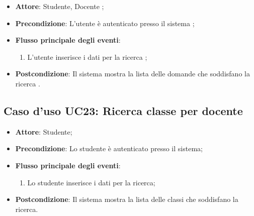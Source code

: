 \documentclass[12pt,a4paper]{article}
\begin{document}
\begin{itemize}

\item \textbf{Attore}: Studente, Docente
; 
\item \textbf{Precondizione}: L'utente è autenticato presso il sistema
;

\item \textbf{Flusso principale degli eventi}:
\begin{enumerate}
	\item L'utente inserisce i dati per la ricerca	;
	
\end{enumerate}
\item \textbf{Postcondizione}: Il sistema mostra la lista delle domande che soddisfano la ricerca
.
\end{itemize}
\hypertarget{UC23}{}
\subsection{Caso d'uso UC23: Ricerca classe per docente}

\begin{itemize}

\item \textbf{Attore}: Studente; 
\item \textbf{Precondizione}: Lo studente è autenticato presso il sistema;

\item \textbf{Flusso principale degli eventi}:
\begin{enumerate}
	\item Lo studente inserisce i dati per la ricerca;
	
\end{enumerate}
\item \textbf{Postcondizione}: Il sistema mostra la lista delle classi che soddisfano la ricerca.
\end{itemize}
\hypertarget{UC24}{}
\end{document}
